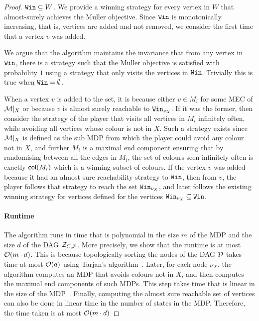 \begin{proof}
    \textit{$\texttt{Win}\subseteq W$.} We provide a winning strategy for every vertex in $W$ that almost-surely achieves the Muller objective.  Since $\texttt{Win}$ is monotonically increasing, that is, vertices are added and not removed, we consider the first time that a vertex $v$ was added.

    We argue that the algorithm maintains the invariance that from any vertex in $\texttt{Win}$, there is a strategy such that the Muller objective is satisfied with probability $1$ using a strategy that only visits the vertices in $\texttt{Win}$.  Trivially this is true when $\texttt{Win} = \emptyset$. 

    When a vertex $v$ is added to the set, it is because either $v\in M_i$ for some MEC of $\mathcal{M}|_X$ or because $v$ is almost surely reachable to $\texttt{Win}_{\nu_X}$.
    If it was the former, then consider the strategy of the player that visits all vertices in $M_i$ infinitely often, while avoiding all vertices whose colour is not in $X$.  Such a strategy exists since $\mathcal{M}|_X$ is defined as the sub MDP from which the player could avoid any colour not in $X$, and further $M_i$ is a maximal end component ensuring that by randomising between all the edges in $M_i$, the set of colours seen infinitely often is exactly ${\mathsf{col}}(M_i)$ which is a winning subset of colours. 
    If the vertex $v$ was added because it had an almost sure reachability strategy to $\texttt{Win}$, then from $v$, the player follows that strategy to reach the set $\texttt{Win}_{\nu_X}$, and later follows the existing winning strategy for vertices defined for the vertices $\texttt{Win}_{\nu_X}\subseteq \texttt{Win}$. 
    \paragraph*{Runtime} The algorithm runs in time that is polynomial in the size $m$ of the MDP and the size $d$ of the DAG $\mathcal{Z}_{C,\mathcal{F}}$. More precisely, we show that the runtime is at most $\mathcal{O}( m\cdot d)$.
    This is because topologically sorting the nodes of the DAG $\mathcal{D}$ takes time at most $\mathcal{O}(d)$ using Tarjan's algorithm~\cite{Tar72}. 
    Later, for each node $\nu_X$, the algorithm computes an MDP that avoids colours not in $X$, and then computes the maximal end components of such MDPs. This step takes time that is linear in the size of the MDP~\cite{CH11}. Finally, computing the almost sure reachable set of vertices can also be done in linear time in the number of states in the MDP. Therefore, the time taken is at most $\mathcal{O}(m\cdot d)$
\end{proof}
\MAcheckNPhard*
